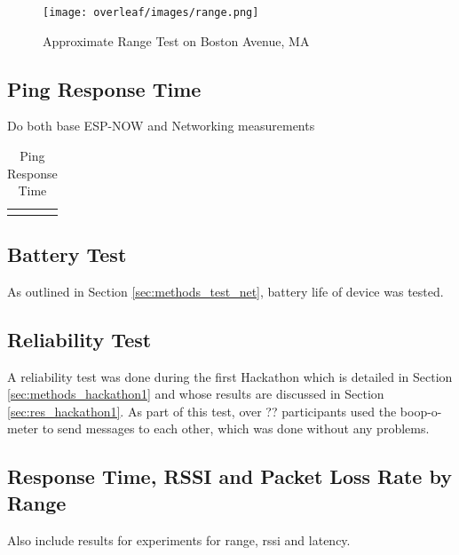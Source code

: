 \begin{figure}[H]
    \centering
    \texttt{[image: overleaf/images/range.png]}
    \vspace{\ftspace}
    \caption{Approximate Range Test on Boston Avenue, MA}
    \label{fig:range}
\end{figure}

\subsection{\label{sec:res_ping}Ping Response Time}

Do both base ESP-NOW and Networking measurements

\begin{table}[H]
    \centering
    \begin{tabular}{|c|c|}
        \hline
         &  \\
         \hline
         &  \\
         \hline
    \end{tabular}
    \vspace{\ftspace}
    \caption{Ping Response Time}
    \label{tab:ping}
\end{table}

\subsection{\label{sec:res_battery}Battery Test}

As outlined in Section \ref{sec:methods_test_net}, battery life of device was tested.

\subsection{\label{sec:res_reliability}Reliability Test}
A reliability test was done during the first Hackathon which is detailed in Section \ref{sec:methods_hackathon1} and whose results are discussed in Section \ref{sec:res_hackathon1}. As part of this test, over ?? participants used the boop-o-meter to send messages to each other, which was done without any problems.

\subsection{\label{sec:res_rssi}Response Time, RSSI and Packet Loss Rate by Range}

Also include results for experiments for range, rssi and latency.

